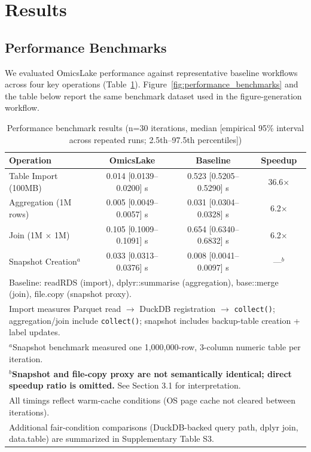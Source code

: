 \documentclass[11pt,a4paper]{article}
\begin{document}
\section{Results}

\subsection{Performance Benchmarks}

We evaluated OmicsLake performance against representative baseline workflows across four key operations (Table~\ref{tab:benchmarks}). Figure~\ref{fig:performance_benchmarks} and the table below report the same benchmark dataset used in the figure-generation workflow.

\begin{table}[H]
\centering
\caption{Performance benchmark results (n=30 iterations, median [empirical 95\% interval across repeated runs; 2.5th--97.5th percentiles])}
\label{tab:benchmarks}
\begin{tabular}{lccc}
\toprule
\textbf{Operation} & \textbf{OmicsLake} & \textbf{Baseline} & \textbf{Speedup} \\
\midrule
Table Import (100MB) & 0.014 [0.0139--0.0200] s & 0.523 [0.5205--0.5290] s & 36.6$\times$ \\
Aggregation (1M rows) & 0.005 [0.0049--0.0057] s & 0.031 [0.0304--0.0328] s & 6.2$\times$ \\
Join (1M $\times$ 1M) & 0.105 [0.1009--0.1091] s & 0.654 [0.6340--0.6832] s & 6.2$\times$ \\
Snapshot Creation$^a$ & 0.033 [0.0313--0.0376] s & 0.008 [0.0041--0.0097] s & ---$^{b}$ \\
\bottomrule
\multicolumn{4}{l}{\small Baseline: readRDS (import), dplyr::summarise (aggregation), base::merge (join), file.copy (snapshot proxy).}\\
\multicolumn{4}{l}{\small Import measures Parquet read $\rightarrow$ DuckDB registration $\rightarrow$ \texttt{collect()}; aggregation/join include \texttt{collect()}; snapshot includes backup-table creation + label updates.}\\
\multicolumn{4}{l}{\small $^a$Snapshot benchmark measured one 1,000,000-row, 3-column numeric table per iteration.}\\
\multicolumn{4}{l}{\small $^{b}$\textbf{Snapshot and file-copy proxy are not semantically identical; direct speedup ratio is omitted.} See Section 3.1 for interpretation.}\\
\multicolumn{4}{l}{\small All timings reflect warm-cache conditions (OS page cache not cleared between iterations).}\\
\multicolumn{4}{l}{\small Additional fair-condition comparisons (DuckDB-backed query path, dplyr join, data.table) are summarized in Supplementary Table S3.}
\end{tabular}
\end{table}
\end{document}
